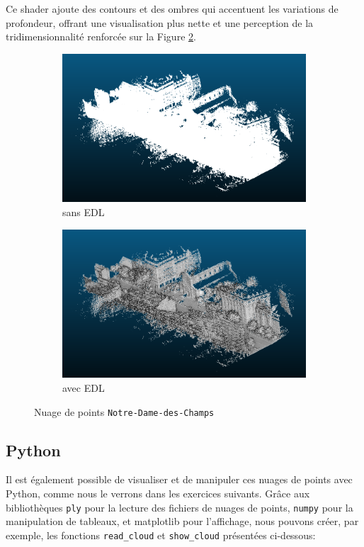 \documentclass[../5RO17_TP4.tex]{subfiles}
\begin{document}
\noindent Ce shader ajoute des contours et des ombres qui accentuent les variations de profondeur, offrant une visualisation plus nette et une perception de la tridimensionnalité renforcée sur la Figure \ref{fig:avec_EDF}.
\begin{figure}[H]
    \centering
    \begin{subfigure}[b]{0.475\textwidth}
        \centering
        \includegraphics[width=\linewidth]{images/Notre.png}
        \caption{sans EDL}
        \label{fig:sans_EDF}
    \end{subfigure}\hfill
    \begin{subfigure}[b]{0.475\textwidth}
        \centering
        \includegraphics[width=\linewidth]{images/NotreEDL.png}
        \caption{avec EDL}
        \label{fig:avec_EDF}
    \end{subfigure}
    \caption{Nuage de points \texttt{Notre-Dame-des-Champs}}
    \label{fig:cloudcompare_ndc}
\end{figure}


\subsection{Python}
\noindent Il est également possible de visualiser et de manipuler ces nuages de points avec Python, comme nous le verrons dans les exercices suivants. Grâce aux bibliothèques \texttt{ply} pour la lecture des fichiers de nuages de points, \texttt{numpy} pour la manipulation de tableaux, et matplotlib pour l’affichage, nous pouvons créer, par exemple, les fonctions \texttt{read\_cloud} et \texttt{show\_cloud} présentées ci-dessous:
\end{document}
